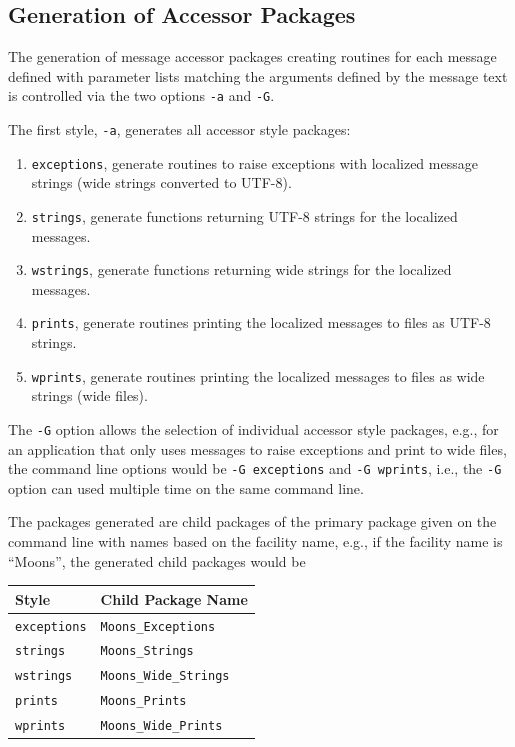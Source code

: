 \subsection{Generation of Accessor Packages}

The generation of message accessor packages creating routines for each
message defined with parameter lists matching the arguments defined by the
message text is controlled via the two options \verb|-a| and \verb|-G|.

The first style, \verb|-a|, generates all accessor style packages:
\begin{enumerate}
\item \verb|exceptions|, generate routines to raise exceptions with localized
     message strings (wide strings converted to UTF-8).
\item \verb|strings|, generate functions returning UTF-8 strings for the
     localized messages.
\item \verb|wstrings|, generate functions returning wide strings for the
     localized messages.
\item \verb|prints|, generate routines printing the localized messages to
     files as UTF-8 strings.
\item \verb|wprints|, generate routines printing the localized messages to
     files as wide strings (wide files).
\end{enumerate}

The \verb|-G| option allows the selection of individual accessor style
packages, e.g., for an application that only uses messages to raise
exceptions and print to wide files, the command line options would be
\verb|-G exceptions| and \verb|-G wprints|, i.e., the \verb|-G| option
can used multiple time on the same command line.

The packages generated are child packages of the primary package given on
the command line with names based on the facility name, e.g., if the
facility name is ``Moons'', the generated child packages would be
\begin{center}
\begin{tabular}{ll}
Style & Child Package Name\\\hline
\verb|exceptions| & \verb|Moons_Exceptions|\\
\verb|strings|    & \verb|Moons_Strings|\\
\verb|wstrings|   & \verb|Moons_Wide_Strings|\\
\verb|prints|     & \verb|Moons_Prints|\\
\verb|wprints|    & \verb|Moons_Wide_Prints|
\end{tabular}
\end{center}

